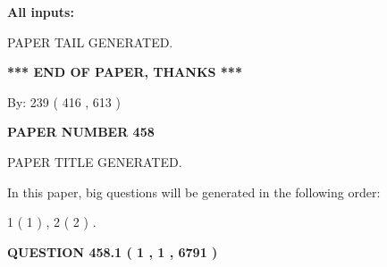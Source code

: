 \documentclass[12pt]{article}
\begin{document}
   
   
   
\noindent{}
   
   
   
   
\noindent\vspace{0.1in}\hspace{-0.08in} {\textbf{\Large{All inputs: }}}
   
   
   
   
   
   
 \vspace{0.2in}
 
   
   
\vspace{2.0in} PAPER TAIL GENERATED.
   
   
   
   
\vspace{1.0in} 
{\textbf{\large{ *** END OF PAPER, THANKS *** }}} 
   
   
\hspace{1.0in} By: 
 239 ( 416 ,  613 )
   
   
   
   
\newpage 
\setcounter{page}{ 
   458001 } 
   
   
   
   
 {\textbf{ \Large{ PAPER NUMBER  458  }}}
   
   
\vspace{0.2in}
   
   
   
   
   
   
   
   
 \vspace{0.2in}
 
 
 
 
   
   
 PAPER TITLE GENERATED.
   
   
   
\vspace{0.2in}
   
In this paper, big questions will be generated in the following order: 
   
   
   1 ( 1 )
 ,
   2 ( 2 )
 .
  
\vspace{0.2in}
  
{\textbf{\Large{QUESTION
458.1 
 ( 1 , 1 , 6791 )
}}}
  
\end{document}

